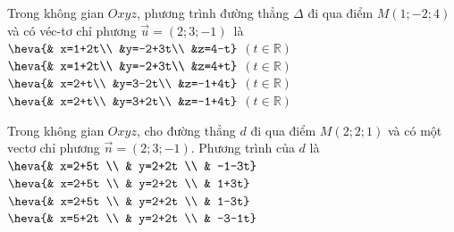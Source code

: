 \begin{ex}%
	Trong không gian $Oxyz$, phương trình  đường thẳng $\Delta$ đi qua điểm $M(1;-2;4)$ và có véc-tơ chỉ phương $\overrightarrow{u}=(2;3;-1)$~là
	 \choice
		{\True $\heva{& x=1+2t\\ &y=-2+3t\\ &z=4-t}$ $(t  \in \mathbb{R})$}
		{$\heva{&  x=1+2t\\ &y=-2+3t\\ &z=4+t}$ $(t\in\mathbb{R})$}
		{$\heva{& x=2+t\\  &y=3-2t\\ &z=-1+4t}$ $(t\in\mathbb{R})$}
		{$\heva{&  x=2+t\\ &y=3+2t\\ &z=-1+4t}$ $(t\in\mathbb{R})$}
\end{ex}

\begin{ex}%
	Trong không gian $Oxyz$, cho đường thẳng $d$ đi qua điểm $M(2;2;1)$ và có một vectơ chỉ phương $\overrightarrow{n}=(2;3;-1)$.  Phương trình của $d$ là
	\choice 
		{\True $\heva{& x=2+5t \\ & y=2+2t \\ & -1-3t}$} 
		 {$\heva{& x=2+5t \\ & y=2+2t \\ & 1+3t}$}
		 {$\heva{& x=2+5t \\ & y=2+2t \\ & 1-3t}$}
		{$\heva{& x=5+2t \\ & y=2+2t \\ & -3-1t}$} 
\end{ex}

